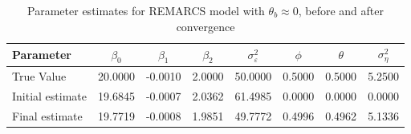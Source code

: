 \begin{table}[H]
\centering\begin{tabular}{lccccccc}
\toprule
Parameter & $\beta_0$ & $\beta_1$ & $\beta_2$ & $\sigma_\varepsilon^2$ & $\phi$ & $\theta$ & $\sigma_\eta^2$ \\
\midrule
True Value & 20.0000 & -0.0010 & 2.0000 & 50.0000 & 0.5000 & 0.5000 & 5.2500 \\
\midrule
Initial estimate & 19.6845 & -0.0007 & 2.0362 & 61.4985 & 0.0000 & 0.0000 & 0.0000 \\
Final estimate & 19.7719 & -0.0008 & 1.9851 & 49.7772 & 0.4996 & 0.4962 & 5.1336 \\
\hline
\end{tabular}
\caption{Parameter estimates for REMARCS model with $\theta_b \approx 0$, before and after convergence}
\label{tab:param_estimates_mab}
\end{table}


